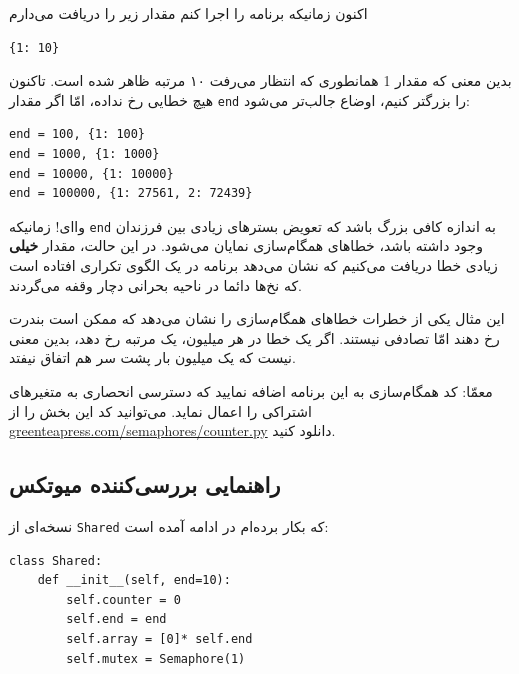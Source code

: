 \documentclass{book}
\newcommand{\clearemptydoublepage}{\newpage\cleardoublepage}
\begin{document}
    اکنون زمانیکه برنامه را اجرا کنم مقدار زیر را دریافت می‌دارم 

\begin{latin}
\begin{verbatim}
{1: 10}
\end{verbatim}
\end{latin}

    بدین معنی که مقدار 1 همانطوری که انتظار می‌رفت ۱۰ مرتبه ظاهر شده است. 
    تاکنون هیچ خطایی رخ نداده، امّا اگر مقدار {\tt end} را بزرگتر کنیم، اوضاع جالب‌تر می‌شود:‌

\begin{latin}
\begin{verbatim}
end = 100, {1: 100}
end = 1000, {1: 1000}
end = 10000, {1: 10000}
end = 100000, {1: 27561, 2: 72439}
\end{verbatim}
\end{latin}

    واای! زمانیکه {\tt end}  به اندازه کافی بزرگ باشد که تعویض بستر‌های زیادی بین فرزندان وجود داشته باشد، خطاهای همگام‌سازی نمایان می‌شود. 
    در این حالت، مقدار \textbf{خیلی} زیادی خطا دریافت می‌کنیم که نشان می‌دهد برنامه در یک الگوی تکراری افتاده است که نخ‌ها دائما در ناحیه بحرانی 
    دچار وقفه می‌گردند. 

    این مثال یکی از خطرات خطاهای همگام‌سازی را نشان می‌دهد که ممکن است بندرت رخ دهند امّا تصادفی نیستند. 
    اگر یک خطا در هر میلیون، یک مرتبه رخ دهد، بدین معنی نیست که یک میلیون بار پشت سر هم اتفاق نیفتد. 

    معمّا: کد همگام‌سازی به این برنامه اضافه نمایید که دسترسی انحصاری به متغیرهای اشتراکی را اعمال نماید. 
    می‌توانید کد این بخش را از \url{greenteapress.com/semaphores/counter.py} دانلود کنید. 


\clearemptydoublepage
\subsection{راهنمایی بررسی‌کننده میوتکس}

    نسخه‌ای از  {\tt Shared} که بکار برده‌ام در ادامه آمده است: 
\begin{latin}
\begin{lstlisting}
class Shared:
    def __init__(self, end=10):
        self.counter = 0
        self.end = end
        self.array = [0]* self.end
        self.mutex = Semaphore(1)
\end{lstlisting}
\end{latin}
\end{document}
